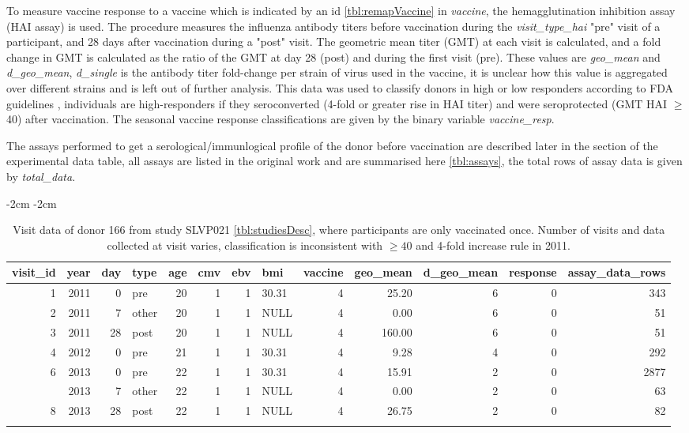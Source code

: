 To measure vaccine response to a vaccine which is indicated by an id
\autoref{tbl:remapVaccine} in \textit{vaccine}, the hemagglutination inhibition
assay (HAI assay) is used. The procedure measures the influenza antibody titers
before vaccination during the \textit{visit\_type\_hai} "pre" visit of a
participant, and 28 days after vaccination during a "post" visit. The geometric
mean titer (GMT) at each visit is calculated, and a fold change in GMT is
calculated as the ratio of the GMT at day 28 (post) and during the first visit
(pre). These values are \textit{geo\_mean} and \textit{d\_geo\_mean},
\textit{d\_single} is the antibody titer fold-change per strain of virus used
in the vaccine, it is unclear how this value is aggregated over different
strains and is left out of further analysis.  This data was used to classify
donors in high or low responders according to FDA guidelines \cite{},
individuals are high-responders if they seroconverted (4-fold or greater rise
in HAI titer) and were seroprotected (GMT HAI \(\ge\) 40) after vaccination.
The seasonal vaccine response classifications are given by the binary variable
\textit{vaccine\_resp}.

The assays performed to get a serological/immunlogical profile of the donor
before vaccination are described later in the section of the experimental data
table, all assays are listed in the original work
\cite{tomicFluPRINTDatasetMultidimensional2019} and are summarised here
\autoref{tbl:assays}, the total rows of assay data is given by
\textit{total\_data}.

\begin{table}[htpb]
\addtolength{\leftskip} {-2cm} %
\addtolength{\rightskip} {-2cm} %
\begin{tabular}{rrrlrrrlrrrrr}
\toprule{}
visit\_id & year & day & type & age & cmv & ebv & bmi & vaccine & geo\_mean & d\_geo\_mean & response & assay\_data\_rows\\
\midrule{}
1 & 2011 & 0 & pre & 20 & 1 & 1 & 30.31 & 4 & 25.20 & 6 & 0 & 343\\
2 & 2011 & 7 & other & 20 & 1 & 1 & NULL & 4 & 0.00 & 6 & 0 & 51\\
3 & 2011 & 28 & post & 20 & 1 & 1 & NULL & 4 & 160.00 & 6 & 0 & 51\\
4 & 2012 & 0 & pre & 21 & 1 & 1 & 30.31 & 4 & 9.28 & 4 & 0 & 292\\
6 & 2013 & 0 & pre & 22 & 1 & 1 & 30.31 & 4 & 15.91 & 2 & 0 & 2877\\
\addlinespace
7 & 2013 & 7 & other & 22 & 1 & 1 & NULL & 4 & 0.00 & 2 & 0 & 63\\
8 & 2013 & 28 & post & 22 & 1 & 1 & NULL & 4 & 26.75 & 2 & 0 & 82\\
\bottomrule{}
\end{tabular}
\caption{Visit data of donor 166 from study SLVP021 \autoref{tbl:studiesDesc},
where participants are only vaccinated once.
Number of visits and data collected at visit varies, classification is
inconsistent with \( \geq 40\) and 4-fold increase
rule in 2011.}\label{tbl:visit166}
\end{table}

